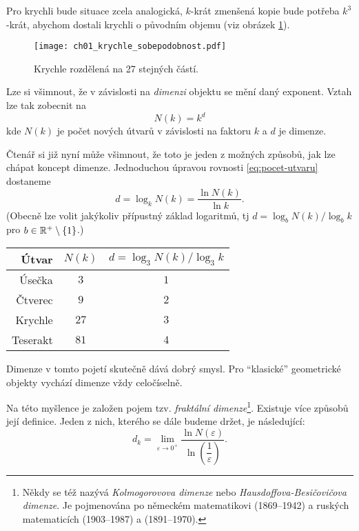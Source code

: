 Pro krychli bude situace zcela analogická, $k$-krát zmenšená kopie bude potřeba $k^3$-krát, abychom dostali krychli o původním objemu (viz obrázek \ref{fig:krychle-sobepodobnost}).
\begin{figure}[h]
    \centering
    \texttt{[image: ch01\_krychle\_sobepodobnost.pdf]}
    \caption{Krychle rozdělená na 27 stejných částí.}
    \label{fig:krychle-sobepodobnost}
\end{figure}
Lze si všimnout, že v závislosti na \emph{dimenzi} objektu se mění daný exponent. Vztah lze tak zobecnit na
\begin{equation}\label{eq:pocet-utvaru}
    N(k)=k^d
\end{equation}
kde $N(k)$ je počet nových útvarů v závislosti na faktoru $k$ a $d$ je dimenze.\par
Čtenář si již nyní může všimnout, že toto je jeden z možných způsobů, jak lze chápat koncept dimenze. Jednoduchou úpravou rovnosti \eqref{eq:pocet-utvaru} dostaneme
\[d=\log_k{N(k)}=\dfrac{\ln{N(k)}}{\ln{k}}.\]
(Obecně lze volit jakýkoliv přípustný základ logaritmů, tj $d=\log_b{N(k)}/\log_b{k}$ pro $b\in\mathbb{R}^+\setminus\left\{1\right\}$.)
\begin{table}[h]
    \centering
    \begin{tabular}{r|cc}
    Útvar    & $N(k)$ & $d=\log_3{N(k)}/\log_3{k}$ \\ \hline
    Úsečka   & $3$      & $1$                          \\
    Čtverec  & $9$      & $2$                          \\
    Krychle  & $27$     & $3$                          \\
    Teserakt & $81$     & $4$                          \\
    \end{tabular}
    \label{table:eukleides-dimenze}
\end{table}
Dimenze v tomto pojetí skutečně dává dobrý smysl. Pro ``klasické'' geometrické objekty vychází dimenze vždy celočíselně.\par
Na této myšlence je založen pojem tzv. \emph{fraktální dimenze}\footnote{Někdy se též nazývá \emph{Kolmogorovova dimenze} nebo \emph{Hausdoffova-Besičovičova dimenze}. Je pojmenována po německém matematikovi  (1869--1942) a ruských matematicích  (1903--1987) a  (1891--1970).}. Existuje více způsobů její definice. Jeden z nich, kterého se dále budeme držet, je následující:
\begin{equation}\label{eq:fraktalni-dimenze}
    d_k=\lim_{\varepsilon\to 0^+}{\dfrac{\ln{N(\varepsilon)}}{\ln{\left(\dfrac{1}{\varepsilon}\right)}}}.
\end{equation}
